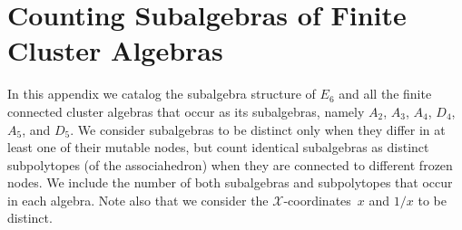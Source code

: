 \documentclass[11pt]{article}
\def\xcoords{$\mathcal{X}$-coordinates}
\begin{document}
\appendix

\newpage

\section{Counting Subalgebras of Finite Cluster Algebras}\label{appendix:subalgebras}
In this appendix we catalog the subalgebra structure of $E_6$ and all the finite connected cluster algebras that occur as its subalgebras, namely $A_2$, $A_3$, $A_4$, $D_4$, $A_5$, and $D_5$. We consider subalgebras to be distinct only when they differ in at least one of their mutable nodes, but count identical subalgebras as distinct subpolytopes (of the associahedron) when they are connected to different frozen nodes. We include the number of both subalgebras and subpolytopes that occur in each algebra. Note also that we consider the \xcoords\ $x$ and $1/x$ to be distinct.
\end{document}
